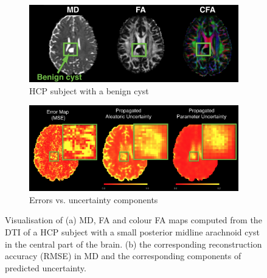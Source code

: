 \begin{figure}[ht]
	\centering
	\begin{subfigure}{0.9\textwidth}
		\caption{HCP subject with a benign cyst}
		\includegraphics[width=\linewidth]{chapter_3/figures/fig_12.png}
	\end{subfigure}
	\begin{subfigure}{0.9\textwidth}
		\vspace{3mm}
		\caption{Errors vs. uncertainty components}
		\includegraphics[width=\linewidth]{chapter_3/figures/fig_9_2.png}
	\end{subfigure}
	\caption{\footnotesize Visualisation of (a) MD, FA and colour FA maps computed from the DTI of a HCP subject with a small posterior midline arachnoid cyst in the central part of the brain. (b) the corresponding reconstruction accuracy (RMSE) in MD and the corresponding components of predicted uncertainty. }
	\label{fig:healthy_abnormal}
\end{figure}



